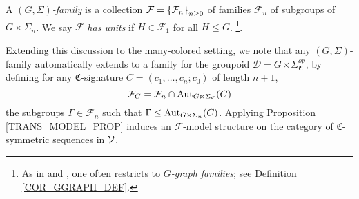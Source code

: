 \documentclass[a4paper,10pt
,draft
]{article}%
\renewcommand{\F}{\mathcal F}
\renewcommand{\1}{\eta}%
\begin{document}
\begin{definition}
      \label{GSFAM_DEF}
      A \textit{$(G, \Sigma)$-family} is a collection $\F = \set{\F_n}_{n \geq 0}$ of families $\F_n$ of subgroups of $G \times \Sigma_n$.
      We say $\F$ \textit{has units} if $H \in \F_1$ for all $H \leq G$. \footnote{
        As in \cite{BP_geo} and \cite{BH15}, one often restricts to \textit{$G$-graph families}; see Definition \ref{COR_GGRAPH_DEF}.}.
      
\end{definition}

  
        

Extending this discussion to the many-colored setting, we note that
any $(G,\Sigma)$-family automatically extends to a family for the groupoid $\mathcal D = G \ltimes \Sigma_{\mathfrak C}^{op}$,
by defining for any $\mathfrak C$-signature $C = (c_1,\dots,c_n;c_0)$ of length $n+1$,
\begin{equation}
      \label{FAMC_DEF_EQ}
      \F_C = \F_n \cap \Aut_{G \ltimes \Sigma_{\mathfrak C}}(C)
\end{equation}
the subgroups $\Gamma \in \F_n$ such that $\Gamma \leq \operatorname{Aut}_{G \times \Sigma_n}(C)$.
Applying Proposition \ref{TRANS_MODEL_PROP} induces an $\F$-model structure on the category of $\mathfrak C$-symmetric sequences in $\mathcal V$.
\end{document}
